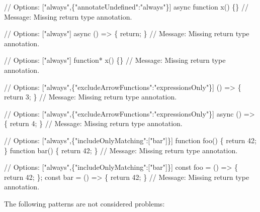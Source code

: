\begin{DoxyCode}
// Options: ["always",\{"annotateUndefined":"always"\}]
async function x() \{\}
// Message: Missing return type annotation.

// Options: ["always"]
async () => \{ return; \}
// Message: Missing return type annotation.

// Options: ["always"]
function* x() \{\}
// Message: Missing return type annotation.

// Options: ["always",\{"excludeArrowFunctions":"expressionsOnly"\}]
() => \{ return 3; \}
// Message: Missing return type annotation.

// Options: ["always",\{"excludeArrowFunctions":"expressionsOnly"\}]
async () => \{ return 4; \}
// Message: Missing return type annotation.

// Options: ["always",\{"includeOnlyMatching":["bar"]\}]
function foo() \{ return 42; \}
function bar() \{ return 42; \}
// Message: Missing return type annotation.

// Options: ["always",\{"includeOnlyMatching":["bar"]\}]
const foo = () => \{ return 42; \};
const bar = () => \{ return 42; \}
// Message: Missing return type annotation.
\end{DoxyCode}


The following patterns are not considered problems\+:



